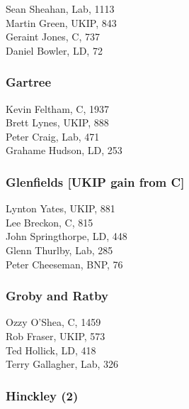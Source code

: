 \documentclass[a4paper,openany,10pt]{book}
\begin{document}


Sean Sheahan, Lab, 1113\\
Martin Green, UKIP, 843\\
Geraint Jones, C, 737\\
Daniel Bowler, LD, 72\\


\subsubsection*{Gartree}



Kevin Feltham, C, 1937\\
Brett Lynes, UKIP, 888\\
Peter Craig, Lab, 471\\
Grahame Hudson, LD, 253\\


\subsubsection*{Glenfields \hspace*{\fill}\nolinebreak[1]%
\enspace\hspace*{\fill}
[UKIP gain from C]}



Lynton Yates, UKIP, 881\\
Lee Breckon, C, 815\\
John Springthorpe, LD, 448\\
Glenn Thurlby, Lab, 285\\
Peter Cheeseman, BNP, 76\\


\subsubsection*{Groby and Ratby}



Ozzy O'Shea, C, 1459\\
Rob Fraser, UKIP, 573\\
Ted Hollick, LD, 418\\
Terry Gallagher, Lab, 326\\


\subsubsection*{Hinckley (2)}
\end{document}
